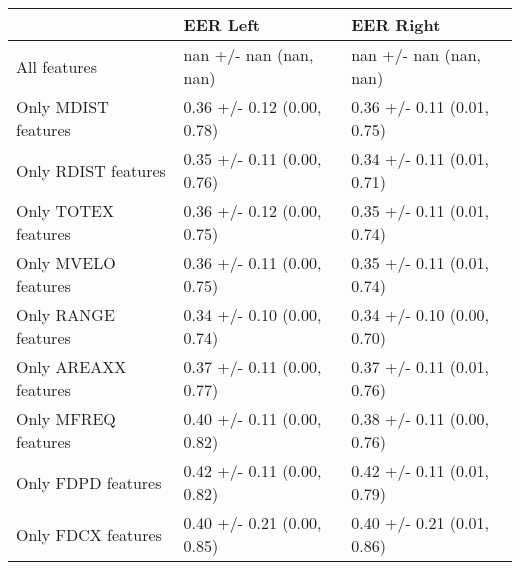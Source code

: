\begin{tabular}{lll}
\toprule
{} &                    EER Left &                   EER Right \\
\midrule
All features         &      nan +/- nan (nan, nan) &      nan +/- nan (nan, nan) \\
Only MDIST features  &  0.36 +/- 0.12 (0.00, 0.78) &  0.36 +/- 0.11 (0.01, 0.75) \\
Only RDIST features  &  0.35 +/- 0.11 (0.00, 0.76) &  0.34 +/- 0.11 (0.01, 0.71) \\
Only TOTEX features  &  0.36 +/- 0.12 (0.00, 0.75) &  0.35 +/- 0.11 (0.01, 0.74) \\
Only MVELO features  &  0.36 +/- 0.11 (0.00, 0.75) &  0.35 +/- 0.11 (0.01, 0.74) \\
Only RANGE features  &  0.34 +/- 0.10 (0.00, 0.74) &  0.34 +/- 0.10 (0.00, 0.70) \\
Only AREAXX features &  0.37 +/- 0.11 (0.00, 0.77) &  0.37 +/- 0.11 (0.01, 0.76) \\
Only MFREQ features  &  0.40 +/- 0.11 (0.00, 0.82) &  0.38 +/- 0.11 (0.00, 0.76) \\
Only FDPD features   &  0.42 +/- 0.11 (0.00, 0.82) &  0.42 +/- 0.11 (0.01, 0.79) \\
Only FDCX features   &  0.40 +/- 0.21 (0.00, 0.85) &  0.40 +/- 0.21 (0.01, 0.86) \\
\bottomrule
\end{tabular}
